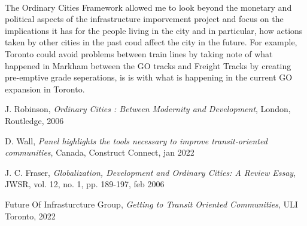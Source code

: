 \documentclass[12pt]{book}
\begin{document}
\paragraph*{}
The Ordinary Cities Framework allowed me to look beyond the monetary and political aspects of the infrastructure imporvement project and focus on the 
implications it has for the people living in the city and in particular, how actions taken by other cities in the past coud affect the city in the 
future. For example, Toronto could avoid problems between train lines by taking note of what happened in Markham between the
GO tracks and Freight Tracks by creating pre-emptive grade seperations, is is with what is happening in the current GO expansion in 
Toronto.\cite{report}
\begin{thebibliography}{1}
        J. Robinson, \textit{Ordinary Cities : Between Modernity and Development}, London, Routledge, 2006

        D. Wall, \textit{Panel highlights the tools necessary to improve transit-oriented communities}, Canada, Construct Connect, jan 2022

        J. C. Fraser, \textit{Globalization, Development and Ordinary Cities: A Review Essay}, JWSR, vol. 12, no. 1, pp. 189-197, feb 2006

        Future Of Infrasturcture Group, \textit{Getting to Transit Oriented Communities}, ULI Toronto, 2022
\end{thebibliography}
\end{document}
